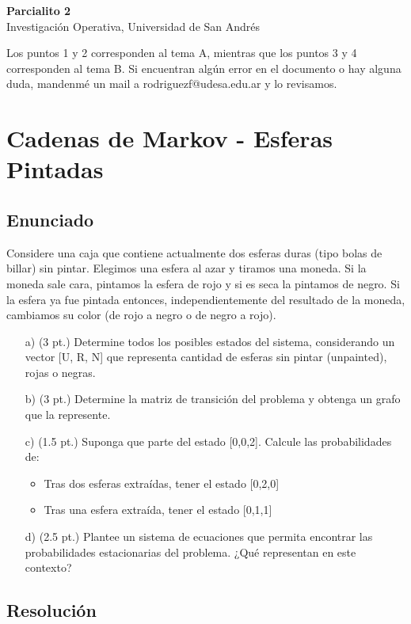 \documentclass[12pt]{article}
\begin{document}
\begin{center}
  {\LARGE \textbf{Parcialito 2}}\\[0.5em]
  {Investigación Operativa, Universidad de San Andrés}
\end{center}

Los puntos 1 y 2 corresponden al tema A, mientras que los puntos 3 y 4 corresponden al tema B. Si encuentran algún error en el documento o hay alguna duda, mandenmé un mail a rodriguezf@udesa.edu.ar y lo revisamos.

\section{Cadenas de Markov - Esferas Pintadas}

\subsection{Enunciado}
Considere una caja que contiene actualmente dos esferas duras (tipo bolas de billar) sin pintar. Elegimos una esfera al azar y tiramos una moneda. Si la moneda sale cara, pintamos la esfera de rojo y si es seca la pintamos de negro. Si la esfera ya fue pintada entonces, independientemente del resultado de la moneda, cambiamos su color (de rojo a negro o de negro a rojo).

\begin{itemize}
    \item[a)] (3 pt.) Determine todos los posibles estados del sistema, considerando un vector [U, R, N] que representa cantidad de esferas sin pintar (unpainted), rojas o negras.
    \item[b)] (3 pt.) Determine la matriz de transición del problema y obtenga un grafo que la represente.
    \item[c)] (1.5 pt.) Suponga que parte del estado [0,0,2]. Calcule las probabilidades de:
    \begin{itemize}
        \item Tras dos esferas extraídas, tener el estado [0,2,0]
        \item Tras una esfera extraída, tener el estado [0,1,1]
    \end{itemize}
    \item[d)] (2.5 pt.) Plantee un sistema de ecuaciones que permita encontrar las probabilidades estacionarias del problema. ¿Qué representan en este contexto?
\end{itemize}

\subsection{Resolución}
\end{document}
